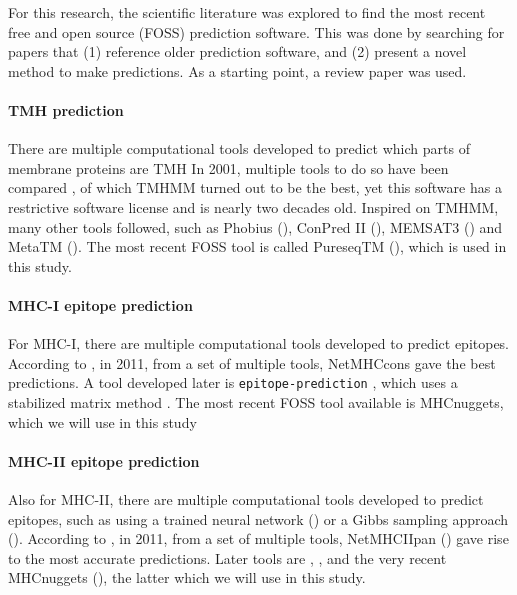 For this research, the scientific literature was explored 
to find the most recent free and open source (FOSS) prediction software.
This was done by searching for papers that (1) reference older
prediction software, and (2) present a novel method to make predictions.
As a starting point, a review paper was used.

\paragraph{TMH prediction}

There are multiple computational tools developed to predict which
parts of membrane proteins are TMH
In 2001, multiple tools to do so have been compared \cite{moller2001evaluation},
of which TMHMM \cite{krogh2001predicting} turned out to be the best, yet
this software has a restrictive software license and is nearly two
decades old. Inspired on TMHMM, many other tools followed, such as 
Phobius (\cite{kall2004combined}),
ConPred II (\cite{arai2004conpred}),
MEMSAT3 (\cite{jones2007improving})
and MetaTM (\cite{klammer2009metatm}).
The most recent FOSS tool is called PureseqTM (\cite{wang2019efficient}),
which is used in this study.

\paragraph{MHC-I epitope prediction}

For MHC-I, there are multiple computational tools developed 
to predict epitopes. 
According to \cite{lundegaard2011prediction}, in 2011,
from a set of multiple tools, 
NetMHCcons \cite{karosiene2012netmhccons} gave the best predictions.
A tool developed later is \verb;epitope-prediction; \cite{bianchi2017},
which uses a stabilized matrix method \cite{kim2009derivation}.
The most recent FOSS tool available is MHCnuggets\cite{shao2020high},
which we will use in this study

\paragraph{MHC-II epitope prediction}

Also for MHC-II, there are multiple computational tools developed 
to predict epitopes,
such as using a trained neural network (\cite{nielsen2003reliable})
or a Gibbs sampling approach (\cite{nielsen2004improved}).
According to \cite{lundegaard2011prediction}, in 2011,
from a set of multiple tools, 
NetMHCIIpan (\cite{nielsen2008quantitative,karosiene2013netmhciipan})
gave rise to the most accurate predictions.
Later tools are \cite{zhang2013predicting},
\cite{trolle2014nettepi}, \cite{zhang2015accurate}
and the very recent MHCnuggets (\cite{shao2020high}),
the latter which we will use in this study.

